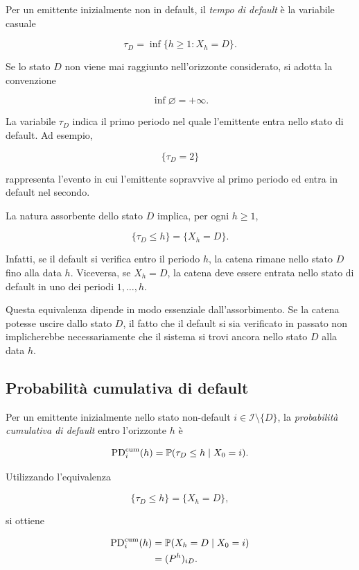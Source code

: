 \begin{definition}
Per un emittente inizialmente non in default, il \emph{tempo di
default} \`{e} la variabile casuale

\[
\tau_D
=
\inf
\{
h\geq 1:X_h=D
\}.
\]

Se lo stato $D$ non viene mai raggiunto nell'orizzonte considerato,
si adotta la convenzione

\[
\inf\varnothing=+\infty.
\]
\end{definition}

La variabile $\tau_D$ indica il primo periodo nel quale l'emittente
entra nello stato di default. Ad esempio,

\[
\{\tau_D=2\}
\]

rappresenta l'evento in cui l'emittente sopravvive al primo periodo ed
entra in default nel secondo.

La natura assorbente dello stato $D$ implica, per ogni $h\geq 1$,

\[
\{\tau_D\leq h\}
=
\{X_h=D\}.
\]

Infatti, se il default si verifica entro il periodo $h$, la catena
rimane nello stato $D$ fino alla data $h$. Viceversa, se
$X_h=D$, la catena deve essere entrata nello stato di default in uno
dei periodi $1,\ldots,h$.

Questa equivalenza dipende in modo essenziale dall'assorbimento. Se la
catena potesse uscire dallo stato $D$, il fatto che il default si sia
verificato in passato non implicherebbe necessariamente che il sistema
si trovi ancora nello stato $D$ alla data $h$.

\subsection{Probabilit\`{a} cumulativa di default}

\label{subsec:cap9-pd-cumulativa}

\begin{definition}
Per un emittente inizialmente nello stato non-default
$i\in\mathcal{I}\setminus\{D\}$, la \emph{probabilit\`{a} cumulativa
di default} entro l'orizzonte $h$ \`{e}

\[
\mathrm{PD}_{i}^{\mathrm{cum}}(h)
=
\mathbb{P}(\tau_D\leq h\mid X_0=i).
\]
\end{definition}

Utilizzando l'equivalenza

\[
\{\tau_D\leq h\}
=
\{X_h=D\},
\]

si ottiene

\[
\begin{split}
\mathrm{PD}_{i}^{\mathrm{cum}}(h)
&=
\mathbb{P}(X_h=D\mid X_0=i)
\\
&=
(P^h)_{iD}.
\end{split}
\]

